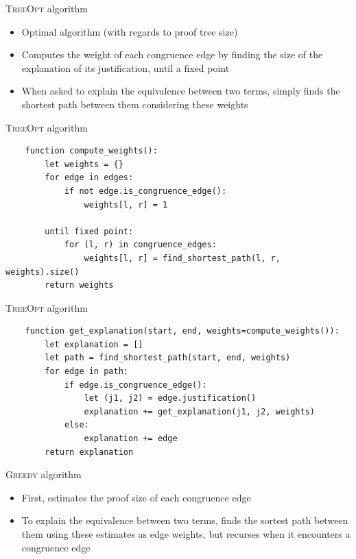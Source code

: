 \documentclass[aspectratio=169]{beamer}
\newcommand\vitem{\vfill\item}
\begin{document}
\begin{frame}{\textsc{TreeOpt} algorithm}
  \begin{itemize}
    \item Optimal algorithm (with regards to proof tree size)
    \vitem Computes the weight of each congruence edge by finding the size of
    the explanation of its justification, until a fixed point
    \vitem When asked to explain the equivalence between two terms, simply finds
    the shortest path between them considering these weights
  \end{itemize}
\end{frame}

\begin{frame}[fragile]{\textsc{TreeOpt} algorithm}
  \begin{verbatim}
    function compute_weights():
        let weights = {}
        for edge in edges:
            if not edge.is_congruence_edge():
                weights[l, r] = 1

        until fixed point:
            for (l, r) in congruence_edges:
                weights[l, r] = find_shortest_path(l, r, weights).size()
        return weights
  \end{verbatim}
\end{frame}

\begin{frame}[fragile]{\textsc{TreeOpt} algorithm}
  \begin{verbatim}
    function get_explanation(start, end, weights=compute_weights()):
        let explanation = []
        let path = find_shortest_path(start, end, weights)
        for edge in path:
            if edge.is_congruence_edge():
                let (j1, j2) = edge.justification()
                explanation += get_explanation(j1, j2, weights)
            else:
                explanation += edge
        return explanation
  \end{verbatim}
\end{frame}

\begin{frame}{\textsc{Greedy} algorithm}
  \begin{itemize}
    \item First, estimates the proof size of each congruence edge
    \vitem To explain the equivalence between two terms, finds the sortest path
    between them using these estimates as edge weights, but recurses when it
    encounters a congruence edge
  \end{itemize}
\end{frame}
\end{document}
